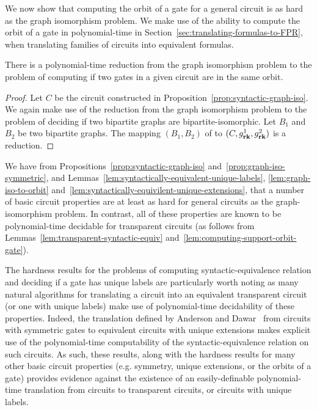 \documentclass[../paper.tex]{subfiles}
\begin{document}
We now show that computing the orbit of a gate for a general circuit is as hard
as the graph isomorphism problem. We make use of the ability to compute the
orbit of a gate in polynomial-time in
Section~\ref{sec:translating-formulas-to-FPR}, when translating families of
circuits into equivalent formulas.

\begin{lem}
  There is a polynomial-time reduction from the graph isomorphism problem to the
  problem of computing if two gates in a given circuit are in the same orbit.
  \label{lem:graph-iso-to-orbit}
\end{lem}
\begin{proof}
  Let $C$ be the circuit constructed in
  Proposition~\ref{prop:syntactic-graph-iso}. We again make use of the reduction
  from the graph isomorphism problem to the problem of deciding if two bipartite
  graphs are bipartite-isomorphic. Let $B_1$ and $B_2$ be two bipartite graphs.
  The mapping $(B_1, B_2)$ of to $(C, g^1_{\text{\textbf{rk}}}, g^2_{\text{\textbf{rk}}})$ is a reduction.
\end{proof}

We have from Propositions~\ref{prop:syntactic-graph-iso}
and~\ref{prop:graph-iso-symmetric}, and
Lemmas~\ref{lem:syntactically-equivalent-unique-labels},
\ref{lem:graph-iso-to-orbit}
and~\ref{lem:syntactically-equivilent-unique-extensions}, that a number of basic
circuit properties are at least as hard for general circuits as the
graph-isomorphism problem. In contrast, all of these properties are known to be
polynomial-time decidable for transparent circuits (as follows from
Lemmas~\ref{lem:transparent-syntactic-equiv}
and~\ref{lem:computing-support-orbit-gate}).

The hardness results for the problems of computing syntactic-equivalence
relation and deciding if a gate has unique labels are particularly worth noting
as many natural algorithms for translating a circuit into an equivalent
transparent circuit (or one with unique labels) make use of polynomial-time
decidability of these properties. Indeed, the translation defined by Anderson
and Dawar~\cite{AndersonD17} from circuits with symmetric gates to equivalent
circuits with unique extensions makes explicit use of the polynomial-time
computability of the syntactic-equivalence relation on such circuits. As such,
these results, along with the hardness results for many other basic circuit
properties (e.g. symmetry, unique extensions, or the orbits of a gate) provides
evidence against the existence of an easily-definable polynomial-time
translation from circuits to transparent circuits, or circuits with unique
labels.
\end{document}
